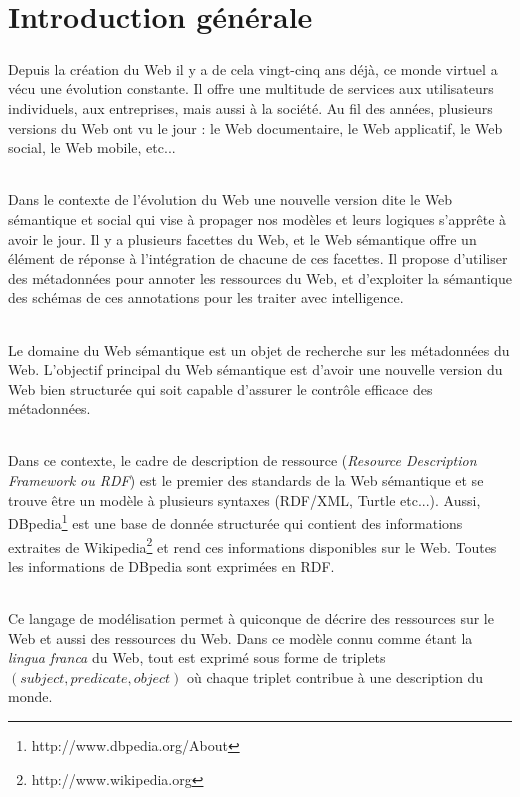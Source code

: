 \chapter{Introduction générale}
\paragraph{}
Depuis la création du Web il y a de cela vingt-cinq ans déjà, ce monde virtuel a vécu une évolution constante. Il offre une multitude de services aux utilisateurs individuels, aux entreprises, mais aussi à la société. Au fil des années, plusieurs versions du Web ont vu le jour : le Web documentaire, le Web applicatif, le Web social, le Web mobile, etc...
\subparagraph{}
Dans le contexte de l’évolution du Web une nouvelle version dite le Web sémantique et social qui vise à propager nos modèles et leurs logiques s’apprête à avoir le jour. Il y a plusieurs facettes du Web, et le Web sémantique offre un élément de réponse à l’intégration de chacune de ces facettes. Il propose d’utiliser des métadonnées pour annoter les ressources du Web, et d’exploiter la sémantique des schémas de ces annotations pour les traiter avec intelligence.
\subparagraph{}
Le domaine du Web sémantique est un objet de recherche sur les métadonnées du Web. L'objectif principal du Web sémantique est d’avoir une nouvelle version du Web bien structurée qui soit capable d’assurer le contrôle efficace des métadonnées. 
\subparagraph{}
Dans ce contexte, le cadre de description de ressource ({\itshape Resource Description Framework ou RDF}) est le premier des standards de la Web sémantique et se trouve être un modèle à plusieurs syntaxes (RDF/XML, Turtle etc...). Aussi, DBpedia\footnote{http://www.dbpedia.org/About} est une base de donnée structurée qui contient des informations extraites de Wikipedia\footnote{http://www.wikipedia.org} et rend ces informations disponibles sur le Web. Toutes les informations de DBpedia sont exprimées en RDF.
\subparagraph{}
Ce langage de modélisation permet à quiconque de décrire des ressources sur le Web et aussi des ressources du Web. Dans ce modèle connu comme étant la {\itshape lingua franca} du Web, tout est exprimé sous forme de triplets $(subject, predicate, object)$ où chaque triplet contribue à une description du monde.
